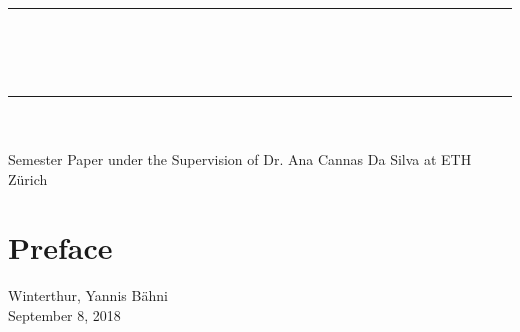 



\frontmatter

\renewcommand*{\thefootnote}{\fnsymbol{footnote}}

\thispagestyle{empty}

\begin{center}
    \rule{\linewidth}{1mm}\\
	\\
	\\
	\rule{\linewidth}{1mm} \\[.5cm]
	\\
	\vspace{5cm}
	Semester Paper under the Supervision of Dr. Ana Cannas Da Silva at ETH Z\"urich
\end{center}
\clearpage

\chapter*{Preface}
\noindent Winterthur, \hfill Yannis B\"ahni\\
September 8, 2018
\tableofcontents

\mainmatter

\renewcommand*{\thefootnote}{\arabic{footnote}}




\appendix
\begin{appendix}

\end{appendix}

\printbibliography
\printindex

